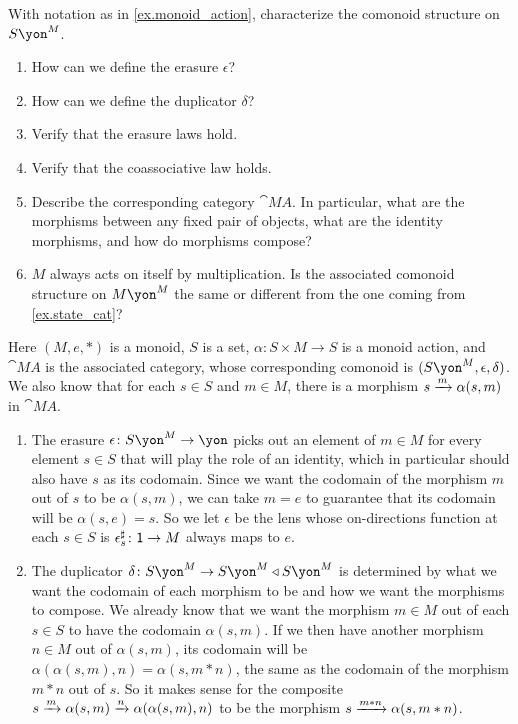 \documentclass[Book-Poly]{subfiles}
\begin{document}
\begin{exercise}
With notation as in \cref{ex.monoid_action}, characterize the comonoid structure on $S\yon^M$.
\begin{enumerate}
    \item How can we define the erasure $\epsilon$?
    \item How can we define the duplicator $\delta$?
    \item Verify that the erasure laws hold.
    \item Verify that the coassociative law holds.
    \item Describe the corresponding category $\cat{M\!A}$.
    In particular, what are the morphisms between any fixed pair of objects, what are the identity morphisms, and how do morphisms compose?
	\item $M$ always acts on itself by multiplication. Is the associated comonoid structure on $M\yon^M$ the same or different from the one coming from \cref{ex.state_cat}?
\qedhere
\end{enumerate}
\begin{solution}
Here $(M,e,*)$ is a monoid, $S$ is a set, $\alpha\colon S\times M\to S$ is a monoid action, and $\cat{M\!A}$ is the associated category, whose corresponding comonoid is $(S\yon^M,\epsilon,\delta)$.
We also know that for each $s\in S$ and $m\in M$, there is a morphism $s\xrightarrow{m} \alpha(s,m)$ in $\cat{M\!A}$.
\begin{enumerate}
    \item The erasure $\epsilon\colon S\yon^M\to\yon$ picks out an element of $m\in M$ for every element $s\in S$ that will play the role of an identity, which in particular should also have $s$ as its codomain.
    Since we want the codomain of the morphism $m$ out of $s$ to be $\alpha(s,m)$, we can take $m=e$ to guarantee that its codomain will be $\alpha(s,e)=s$.
    So we let $\epsilon$ be the lens whose on-directions function at each $s\in S$ is $\epsilon^\sharp_s\colon\textsf{1}\to M$ always maps to $e$.
    \item The duplicator $\delta\colon S\yon^M\to S\yon^M\tri S\yon^M$ is determined by what we want the codomain of each morphism to be and how we want the morphisms to compose.
    We already know that we want the morphism $m\in M$ out of each $s\in S$ to have the codomain $\alpha(s,m)$.
    If we then have another morphism $n\in M$ out of $\alpha(s,m)$, its codomain will be $\alpha(\alpha(s,m),n)=\alpha(s,m*n)$, the same as the codomain of the morphism $m*n$ out of $s$.
    So it makes sense for the composite $s\xrightarrow{m}\alpha(s,m)\xrightarrow{n} \alpha(\alpha(s,m),n)$ to be the morphism $s\xrightarrow{m*n}\alpha(s,m*n)$.

\end{enumerate}
\end{solution}
\end{exercise}
\end{document}
